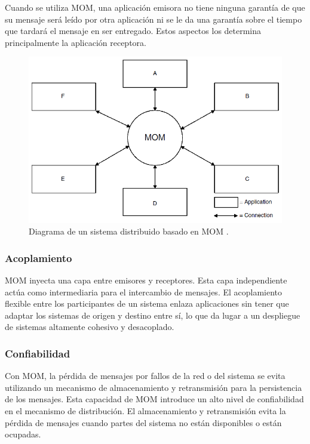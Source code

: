 \documentclass[conference,compsoc]{IEEEtran}
\begin{document}
Cuando se utiliza MOM, una aplicación emisora no tiene ninguna garantía de que su mensaje será leído por otra aplicación ni se le da una garantía sobre el tiempo que tardará el mensaje en ser entregado. Estos aspectos los determina principalmente la aplicación receptora\cite{curry_2004}.

\begin{figure}[t]
    \centering
    \includegraphics[width=\columnwidth]{mom.png}
    \caption{Diagrama de un sistema distribuido basado en MOM \cite[][Fig. 1.4]{curry_2004}.}
    \label{fig:mom}
\end{figure}

\subsubsection{Acoplamiento}

MOM inyecta una capa entre emisores y receptores. Esta capa independiente actúa como intermediaria para el intercambio de mensajes. El acoplamiento flexible entre los participantes de un sistema enlaza aplicaciones sin tener que adaptar los sistemas de origen y destino entre sí, lo que da lugar a un despliegue de sistemas altamente cohesivo y desacoplado\cite{curry_2004}.

\subsubsection{Confiabilidad}

Con MOM, la pérdida de mensajes por fallos de la red o del sistema se evita utilizando un mecanismo de almacenamiento y retransmisión para la persistencia de los mensajes. Esta capacidad de MOM introduce un alto nivel de confiabilidad en el mecanismo de distribución. El almacenamiento y retransmisión evita la pérdida de mensajes cuando partes del sistema no están disponibles o están ocupadas\cite{curry_2004}.
\end{document}
